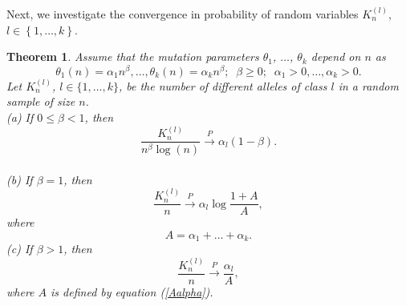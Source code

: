 \documentclass[12pt]{amsart}
\newtheorem{thm}{Theorem}[section]
\theoremstyle{definition}
\numberwithin{equation}{section}
\begin{document}
Next, we investigate the convergence in probability
of random variables $K_n^{(l)}$, $l\in\left\{1,\ldots,k\right\}$.
\begin{thm}\label{TheoremConvergenceInProbability}Assume that the mutation parameters $\theta_1$,
$\ldots$, $\theta_k$ depend on $n$ as
\begin{equation}\label{Thetan}
\theta_1(n)=\alpha_1n^{\beta},\ldots,\theta_k(n)=\alpha_kn^{\beta};\;\;\beta\geq 0;\;\;\alpha_1>0,\ldots,\alpha_k>0.
\end{equation}
Let $K_n^{(l)}$, $l\in\{1,\ldots,k\}$, be the number of different alleles of class $l$ in a random sample of size $n$.\\
(a) If $0\leq \beta<1$, then $$\frac{K_n^{(l)}}{n^{\beta}\log(n)}\overset{P}{\longrightarrow}\alpha_l(1-\beta).$$\\
(b) If $\beta=1$, then $$\frac{K_n^{(l)}}{n}\overset{P}{\longrightarrow}\alpha_l\log\frac{1+A}{A},$$ where
\begin{equation}\label{Aalpha}
A=\alpha_1+\ldots+\alpha_k.
\end{equation}
(c) If $\beta>1$, then
$$
\frac{K_n^{(l)}}{n}\overset{P}{\longrightarrow}\frac{\alpha_l}{A},
$$
where $A$ is defined by equation (\ref{Aalpha}).
\end{thm}
\end{document}
